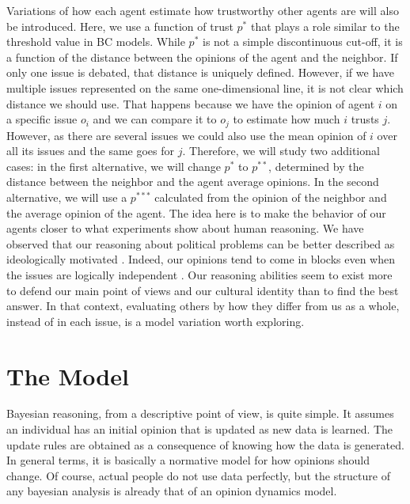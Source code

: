 \documentclass{article}
\begin{document}
Variations of how each agent estimate how trustworthy other agents are will also
be introduced. Here, we use a function of trust $p^*$ that plays a role similar
to the threshold value in BC models. While $p^*$ is not a simple discontinuous
cut-off, it is a function of the distance between the opinions of the agent and
the neighbor. If only one issue is debated, that distance is uniquely defined.
However, if we have multiple issues represented on the same one-dimensional
line, it is not clear which distance we should use. That happens because we have
the opinion of agent $i$ on a specific issue $o_i$ and we can compare it to
$o_j$ to estimate how much $i$ trusts $j$. However, as there are several issues
we could also use the mean opinion of $i$ over all its issues and the same goes
for $j$. Therefore, we will study two additional cases: in the first
alternative, we will change \(p^*\) to \(p^{**}\), determined by the distance
between the neighbor and the agent average opinions. In the second alternative,
we will use a \(p^{***}\) calculated from the opinion of the neighbor and the
average opinion of the agent. The idea here is to make the behavior of our
agents closer to what experiments show about human reasoning. We have observed
that our reasoning about political problems can be better described as
ideologically motivated \cite{jostetal03a,taberlodge06a,Claassen2015a}. Indeed,
our opinions tend to come in blocks even when the issues are logically
independent \cite{jervis76a}. Our reasoning abilities seem to exist more to
defend our main point of views \cite{mercier11a,merciersperber11a} and our
cultural identity \cite{kahanetal11} than to find the best answer. In that
context, evaluating others by how they differ from us as a whole, instead of in
each issue, is a model variation worth exploring.

\section{The Model}

Bayesian reasoning, from a descriptive point of view, is quite simple. It assumes an individual has an initial opinion that is updated as new data is learned. The update rules are obtained as a consequence of knowing how the data is generated. In general terms, it is basically a normative model for how opinions should change. Of course, actual people do not use data perfectly, but the structure of any bayesian analysis is already that of an opinion dynamics model.
\end{document}

